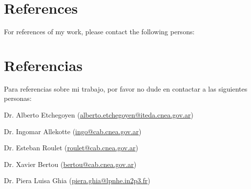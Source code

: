 \ifeng
\section*{References}

For references of my work, please contact the following persons:
\else
\section*{Referencias}

Para referencias sobre mi trabajo, por favor no dude en contactar a las siguientes personas:

\fi
Dr. Alberto Etchegoyen (\href{mailto:alberto.etchegoyen@iteda.cnea.gov.ar}{alberto.etchegoyen@iteda.cnea.gov.ar})

Dr. Ingomar Allekotte (\href{mailto:ingo@cab.cnea.gov.ar}{ingo@cab.cnea.gov.ar})

Dr. Esteban Roulet (\href{mailto:roulet@cab.cnea.gov.ar}{roulet@cab.cnea.gov.ar})

Dr. Xavier Bertou (\href{mailto:bertou@cab.cnea.gov.ar}{bertou@cab.cnea.gov.ar})

Dr. Piera Luisa Ghia (\href{mailto:piera.ghia@lpnhe.in2p3.fr}{piera.ghia@lpnhe.in2p3.fr})
